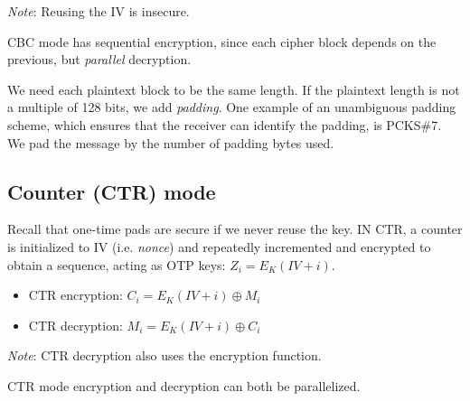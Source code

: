 \medskip

\emph{Note}: Reusing the IV is insecure.

\medskip

CBC mode has sequential encryption, since each cipher block depends on the previous, but \emph{parallel} decryption.

\medskip

We need each plaintext block to be the same length. If the plaintext length is not a multiple of 128 bits, we add \emph{padding}. One example of an unambiguous padding scheme, which ensures that the receiver can identify the padding, is PCKS\#7. We pad the message by the number of padding bytes used.

\subsection{Counter (CTR) mode}
Recall that one-time pads are secure if we never reuse the key. IN CTR, a counter is initialized to IV (i.e. \emph{nonce}) and repeatedly incremented and encrypted to obtain a sequence, acting as OTP keys: $Z_i = E_K(IV + i)$.

\begin{itemize}
    \item CTR encryption: $C_i = E_K(IV + i) \oplus M_i$
    \item CTR decryption: $M_i = E_K(IV + i) \oplus C_i$
\end{itemize}

\medskip

\emph{Note}: CTR decryption also uses the encryption function.

\medskip

CTR mode encryption and decryption can both be parallelized.
